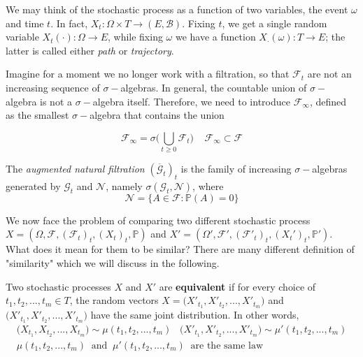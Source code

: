 We may think of the stochastic process as a function of two variables, the event $\omega$ and time $t$. In fact, $X_t : \Omega \times T \to (E,\mathcal{B})$. Fixing $t$, we get a single random variable $X_t(\cdot) : \Omega \to E$, while fixing $\omega$ we have a function $X_{\cdot}(\omega) : T \to E$; the latter is called either \textit{path} or \textit{trajectory}. 

Imagine for a moment we no longer work with a filtration, so that $\mathcal{F}_t$ are not an increasing sequence of $\sigma-$algebras. In general, the countable union of $\sigma-$algebra is not a $\sigma-$algebra itself. Therefore, we need to introduce $\mathcal{F}_{\infty}$, defined as the smallest $\sigma-$algebra that contains the union

\begin{equation*}
    \mathcal{F}_{\infty} = \sigma\Big( \bigcup_{t \geq 0} \mathcal{F}_t \Big) \;\;\;\; \mathcal{F}_{\infty} \subset \mathcal{F}
\end{equation*}

\begin{definition}
    The \textit{augmented natural filtration} $(\overline{\mathcal{G}}_t)_t$ is the family of increasing $\sigma-$algebras generated by $\mathcal{G}_t$ and $\mathcal{N}$, namely $\sigma(\mathcal{G}_t, \mathcal{N})$, where
    \begin{equation*}
        \mathcal{N} = \Big\{ A \in \mathcal{F} : \mathbb{P}(A) =  0 \Big\}
    \end{equation*}
\end{definition}

We now face the problem of comparing two different stochastic process $X = (\Omega, \mathcal{F}, (\mathcal{F}_t)_t, (X_t)_t, \mathbb{P} )$ and $X' = (\Omega', \mathcal{F}', (\mathcal{F}'_t)_t, (X_t')_t, \mathbb{P}' )$. What does it mean for them to be similar? There are many different definition of "similarity" which we will discuss in the following.

\begin{definition}
    Two stochastic processes $X$ and $X'$ are \textbf{equivalent} if for every choice of $t_1,t_2,...,t_m \in T$, the random vectors $X = \big(X'_{t_1},X'_{t_2},...,X'_{t_m}\big)$ and $\big(X'_{t_1},X'_{t_2},...,X'_{t_m}\big)$ have the same joint distribution. In other words,
    \begin{gather*}
        \big(X_{t_1},X_{t_2},...,X_{t_m}\big) \sim \mu(t_1,t_2,...,t_m) \;\;\;      \big(X'_{t_1},X'_{t_2},...,X'_{t_m}\big) \sim \mu'(t_1,t_2,...,t_m) \\
        \mu(t_1,t_2,...,t_m) \;\; \text{and} \;\; \mu'(t_1,t_2,...,t_m) \;\; \text{are the same law}
    \end{gather*}
\end{definition}

